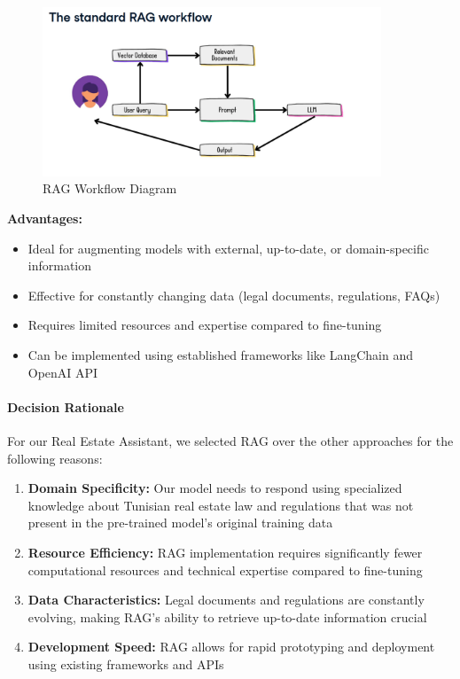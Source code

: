 \begin{figure}[htbp]
    \centering
    \includegraphics[width=0.9\textwidth]{images/rag_workflow_diagram.png}
    \caption{RAG Workflow Diagram}
    \label{fig:rag-workflow}
\end{figure}

\textbf{Advantages:}
\begin{itemize}
    \item Ideal for augmenting models with external, up-to-date, or domain-specific information
    \item Effective for constantly changing data (legal documents, regulations, FAQs)
    \item Requires limited resources and expertise compared to fine-tuning
    \item Can be implemented using established frameworks like LangChain and OpenAI API
\end{itemize}

\paragraph{Decision Rationale}
For our Real Estate Assistant, we selected RAG over the other approaches for the following reasons:

\begin{enumerate}
    \item \textbf{Domain Specificity:} Our model needs to respond using specialized knowledge about Tunisian real estate law and regulations that was not present in the pre-trained model's original training data
    \item \textbf{Resource Efficiency:} RAG implementation requires significantly fewer computational resources and technical expertise compared to fine-tuning
    \item \textbf{Data Characteristics:} Legal documents and regulations are constantly evolving, making RAG's ability to retrieve up-to-date information crucial
    \item \textbf{Development Speed:} RAG allows for rapid prototyping and deployment using existing frameworks and APIs
\end{enumerate}

